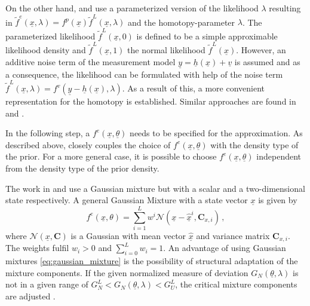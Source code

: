 \documentclass[a4paper]{IEEEtran}
\begin{document}
On the other hand, \cite{hanebeck2003b} and \cite{hanebeck2003} use a parameterized version of the likelihood $\lambda$ resulting in $\tilde{f}^{e}(\underline{x}, \lambda)=f^{p}(\underline{x})\tilde{f}^{L}(\underline{x}, \lambda)$ and the homotopy-parameter $\lambda$. 
The parameterized likelihood $\tilde{f}^{L}(\underline{x}, 0)$ is defined to be a simple approximable likelihood density and $\tilde{f}^{L}(\underline{x}, 1)$ the normal likelihood $\tilde{f}^{L}(\underline{x})$. However, an additive noise term of the measurement model $\underline{y}=\underline{h}(\underline{x}) + \underline{v}$ is assumed and as a consequence,
the likelihood can be formulated with help of the noise term $\tilde{f}^{L}(\underline{x}, \lambda) = f^{v}(\underline{y}-\underline{h}(\underline{x}), \lambda)$. As a result of this, a more convenient representation for the homotopy is established. Similar approaches are found in \cite{hanebeck2012a} and \cite{hanebeck}.

In the following step, a $f^e(\underline{x}, \underline{\theta})$ needs to be specified for the approximation. As described above, \cite{hagmar2011} closely couples the choice of $f^e(\underline{x}, \underline{\theta})$ with the density type of the prior.
For a more general case, it is possible to choose $f^e(\underline{x}, \underline{\theta})$ independent from the density type of the prior density. 

The work in \cite{hanebeck2003} and \cite{hanebeck2003b} use a Gaussian mixture but with a scalar and a two-dimensional state respectively. A general Gaussian Mixture with a state vector $\underline{x}$ is given by
\begin{equation}
    f^{e}(\underline{x}, \theta) = \sum^{L}_{i=1} w^{i} \mathcal{N}(\underline{x}-\underline{\hat{x}}^{i}, \textbf{C}_{x, i}) \,,
    \label{eq:gaussian_mixture}
\end{equation}
where $\mathcal{N}(\underline{x}, \textbf{C})$ is a Gaussian with mean vector $\underline{\hat{x}}$ and variance matrix $\textbf{C}_{x, i}$. The weights fulfil $w_{i} > 0$ and $\sum^{L}_{i=0} w_{i} = 1$.
An advantage of using Gaussian mixtures \eqref{eq:gaussian_mixture} is the possibility of structural adaptation of the mixture components. If the given normalized measure of deviation $G_{N}(\underline{\theta}, \lambda)$ is not in a given range of $G^{L}_{N} < G_{N}(\underline{\theta}, \lambda) < G^{L}_{U}$, 
the critical mixture components are adjusted \cite{hanebeck2003}.
\end{document}

